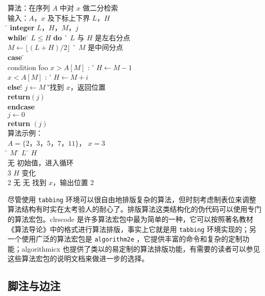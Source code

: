 \newcommand\kw{\textbf} %
\begin{tabbing}
\pushtabs
算法：在序列 $A$ 中对 $x$ 做二分检索 \\
输入：$A$，$x$ 及下标上下界 $L$，$H$ \\ 
\qquad \= \+ \kw{integer} $L，H，M，j$ \\ 
\kw{while} \= \+ $L \leq H$ \kw{do} \` $L$ 与 $H$ 是左右分点 \\
    $M \gets \lfloor(L+H)/2\rfloor$ \` $M$  是中间分点\\
    \kw{case} \= \+ \\
        condition \= foo \+ \kill
        $x > A[M]$ : \' $H \gets M-1$ \\ 
        $x < A[M]$ : \' $H \gets M+i$ \\
            \kw{else}:\' \= $j \gets M$ \`'找到 $x$，返回位置 \\
                \>\kw{return}$(j)$ \\
        \<\< \kw{endcase} \-\-\-\\
$j \gets 0$ \\
\kw{return} $(j)$ \- \\
\poptabs
算法示例：\\
$A = \{2，3，5， 7， 11\}$， $x=3$ \\
\qquad \= \+ $M$ \qquad \= $L$ \qquad \= $H$ \qquad \= \\
无   \>初始值，进入循环 \\
3   \> $H$ 变化 \\
2 \>无 \> 无 \>找到 $x$，输出位置 2
\end{tabbing}

尽管使用 \verb|tabbing| 环境可以很自由地排版复杂的算法，但时刻考虑制表位来调整算法结构有时实在太考验人的耐心了。排版算法这类结构化的伪代码可以使用专门的算法宏包。clrscode 是许多算法宏包中最为简单的一种，它可以按照著名教材《算法导论》中的格式进行算法排版，事实上它就是用 \verb|tabbing| 环境实现的；另一个使用广泛的算法宏包是 \verb|algorithm2e| ，它提供丰富的命令和复杂的定制功能；algorithmicx 也提供了类以的易定制的算法排版功能，有需要的读者可以参见这些算法宏包的说明文档来做进一步的选择。

\subsection{脚注与边注}


